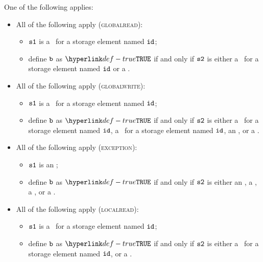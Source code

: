 \ProseParagraph
One of the following applies:
\begin{itemize}
    \item All of the following apply (\textsc{globalread}):
    \begin{itemize}
        \item $\texttt{s1}$ is a \ReadGlobalTerm\ for a storage element named $\texttt{id}$;
        \item define $\texttt{b}$ as $\True$ if and only if $\texttt{s2}$ is either
              a \WriteGlobalTerm\ for a storage element named $\texttt{id}$ or a \RecursiveCallTerm.
    \end{itemize}

    \item All of the following apply (\textsc{globalwrite}):
    \begin{itemize}
        \item $\texttt{s1}$ is a \WriteGlobalTerm\ for a storage element named $\texttt{id}$;
        \item define $\texttt{b}$ as $\True$ if and only if $\texttt{s2}$ is either
              a \WriteGlobalTerm\ for a storage element named $\texttt{id}$,
              a \ReadGlobalTerm\ for a storage element named $\texttt{id}$,
              an \ThrowExceptionTerm, or
              a \RecursiveCallTerm.
    \end{itemize}

    \item All of the following apply (\textsc{exception}):
    \begin{itemize}
        \item $\texttt{s1}$ is an \ThrowExceptionTerm;
        \item define $\texttt{b}$ as $\True$ if and only if $\texttt{s2}$ is either
                an \ThrowExceptionTerm,
                a \WriteLocalTerm,
                a \PerformsAssertionsTerm, or a
                \RecursiveCallTerm.
    \end{itemize}

    \item All of the following apply (\textsc{localread}):
    \begin{itemize}
        \item $\texttt{s1}$ is a \ReadLocalTerm\ for a storage element named $\texttt{id}$;
        \item define $\texttt{b}$ as $\True$ if and only if $\texttt{s2}$ is either
                a \WriteLocalTerm\ for a storage element named $\texttt{id}$, or a
                \RecursiveCallTerm.
    \end{itemize}


\end{itemize}
